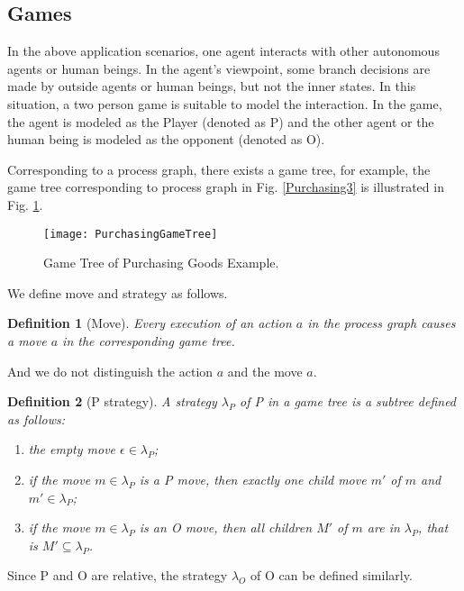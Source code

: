 \documentclass{fac}
\newtheorem{definition}{Definition}[section]
\begin{document}
\subsection{Games}\label{Games}

In the above application scenarios, one agent interacts with other autonomous agents or human beings. In the agent's viewpoint, some branch decisions are made by outside agents or human beings, but not the inner states. In this situation, a two person game is suitable to model the interaction. In the game, the agent is modeled as the Player (denoted as P) and the other agent or the human being is modeled as the opponent (denoted as O).

Corresponding to a process graph, there exists a game tree, for example, the game tree corresponding to process graph in Fig. \ref{Purchasing3} is illustrated in Fig. \ref{PurchasingGameTree}.

\begin{figure}
  \centering
\texttt{[image: PurchasingGameTree]}
  \caption{Game Tree of Purchasing Goods Example.}
  \label{PurchasingGameTree}
\end{figure}

We define move and strategy as follows.

\begin{definition}[Move]
Every execution of an action $a$ in the process graph causes a move $a$ in the corresponding game tree.
\end{definition}

And we do not distinguish the action $a$ and the move $a$.

\begin{definition}[P strategy]
A strategy $\lambda_P$ of P in a game tree is a subtree defined as follows:

\begin{enumerate}
  \item the empty move $\epsilon \in \lambda_P$;
  \item if the move $m \in \lambda_P$ is a P move, then exactly one child move $m'$ of $m$ and $m' \in \lambda_P$;
  \item if the move $m \in \lambda_P$ is an O move, then all children $M'$ of $m$ are in $\lambda_P$, that is $M' \subseteq \lambda_P$.
\end{enumerate}
\end{definition}

Since P and O are relative, the strategy $\lambda_O$ of O can be defined similarly.
\end{document}
